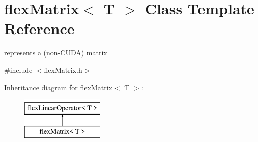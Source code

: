 \hypertarget{classflex_matrix}{}\section{flex\+Matrix$<$ T $>$ Class Template Reference}
\label{classflex_matrix}


represents a (non-\/\+C\+U\+DA) matrix  




{\ttfamily \#include $<$flex\+Matrix.\+h$>$}

Inheritance diagram for flex\+Matrix$<$ T $>$\+:\begin{figure}[H]
\begin{center}
\leavevmode
\includegraphics[height=2.000000cm]{classflex_matrix}
\end{center}
\end{figure}
